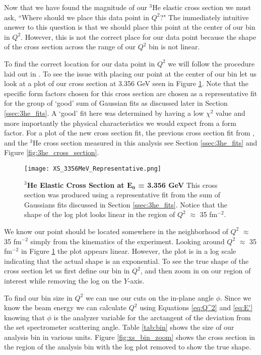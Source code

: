 Now that we have found the magnitude of our $^3$He elastic cross section we must ask, ``Where should we place this data point in $Q^2$?" The immediately intuitive answer to this question is that we should place this point at the center of our bin in $Q^2$. However, this is not the correct place for our data point because the shape of the cross section across the range of our $Q^2$ bin is not linear.
 
To find the correct location for our data point in $Q^2$ we will follow the procedure laid out in \cite{Article:data_placement}. To see the issue with placing our point at the center of our bin let us look at a plot of our cross section at 3.356 GeV seen in Figure \ref{fig:xs_bin}. Note that the specific form factors chosen for this cross section are chosen as a representative fit for the group of `good' sum of Gaussian fits as discussed later in Section \ref{ssec:3he_fits}. A `good' fit here was determined by having a low $\chi^2$ value and more importantly the physical characteristics we would expect from a form factor. For a plot of the new cross section fit, the previous cross section fit from \cite{Article:Amroun}, and the $^3$He cross section measured in this analysis see Section \ref{ssec:3he_fits} and Figure \ref{fig:3he_cross_section}.

\begin{figure}[!ht]
\begin{center}
\texttt{[image: XS\_3356MeV\_Representative.png]}
\end{center}
\caption[$^3$He Elastic Cross Section at $E_0$ = 3.356 GeV]{
{\bf{$^3$He Elastic Cross Section at $\boldsymbol{E_0}$ = 3.356 GeV}} This cross section was produced using a representative fit from the sum of Gaussians fits discussed in Section \ref{ssec:3he_fits}. Notice that the shape of the log plot looks linear in the region of $Q^2$ $\approx$ 35 fm$^{-2}$.}
\label{fig:xs_bin}
\end{figure}

We know our point should be located somewhere in the neighborhood of $Q^2$ $\approx$ 35 fm$^{-2}$ simply from the kinematics of the experiment. Looking around $Q^2$ $\approx$ 35 fm$^{-2}$ in Figure \ref{fig:xs_bin} the plot appears linear. However, the plot is in a log scale indicating that the actual shape is an exponential. To see the true shape of the cross section let us first define our bin in $Q^2$, and then zoom in on our region of interest while removing the log on the $Y$-axis. 

To find our bin size in $Q^2$ we can use our cuts on the in-plane angle $\phi$. Since we know the beam energy we can calculate $Q^2$ using Equations \ref{eq:Q^2} and \ref{eq:E'} knowing that $\phi$ is the analyzer variable for the arctangent of the deviation from the set spectrometer scattering angle. Table \ref{tab:bin} shows the size of our analysis bin in various units. Figure \ref{fig:xs_bin_zoom} shows the cross section in the region of the analysis bin with the log plot removed to show the true shape.

